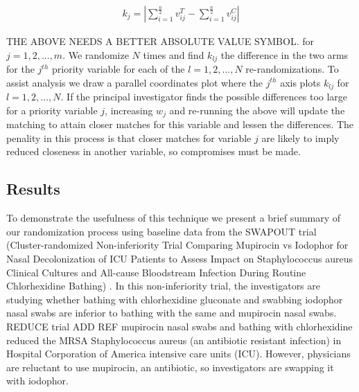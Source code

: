 \documentclass[]{sagej}
\begin{document}
\begin{eqnarray*}
 k_j = | \sum_{i = 1}^{\frac{n}{2}}v_{ij}^T - \sum_{i = 1}^{\frac{n}{2}}v_{ij}^C | 
\end{eqnarray*}

THE ABOVE NEEDS A BETTER ABSOLUTE VALUE SYMBOL. for
\(j = 1, 2, ..., m.\) We randomize \(N\) times and find \(k_{lj}\) the
difference in the two arms for the \(j^{th}\) priority variable for each
of the \(l = 1, 2, ..., N\) re-randomizations. To assist analysis we
draw a parallel coordinates plot where the \(j^{th}\) axis plots
\(k_{lj}\) for \(l = 1, 2, ..., N.\) If the principal investigator finds
the possible differences too large for a priority variable \(j\),
increasing \(w_j\) and re-running the above will update the matching to
attain closer matches for this variable and lessen the differences. The
penality in this process is that closer matches for variable \(j\) are
likely to imply reduced closeness in another variable, so compromises
must be made.

\subsection{Results}\label{results}

To demonstrate the usefulness of this technique we present a brief
summary of our randomization process using baseline data from the
SWAPOUT trial (Cluster-randomized Non-inferiority Trial Comparing
Mupirocin vs Iodophor for Nasal Decolonization of ICU Patients to Assess
Impact on Staphylococcus aureus Clinical Cultures and All-cause
Bloodstream Infection During Routine Chlorhexidine Bathing)
\citep{SOTrial}. In this non-inferiority trial, the investigators are
studying whether bathing with chlorhexidine gluconate and swabbing
iodophor nasal swabs are inferior to bathing with the same and mupirocin
nasal swabs. REDUCE trial ADD REF mupirocin nasal swabs and bathing with
chlorhexidine reduced the MRSA Staphylococcus aureus (an antibiotic
resistant infection) in Hospital Corporation of America intensive care
units (ICU). However, physicians are reluctant to use mupirocin, an
antibiotic, so investigators are swapping it with iodophor.
\end{document}

